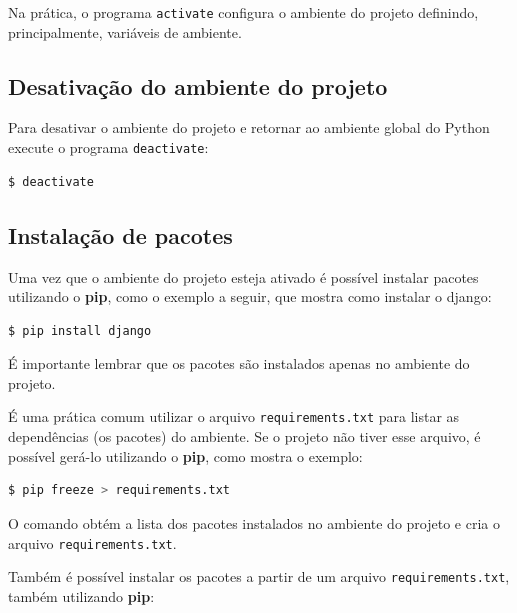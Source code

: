 \documentclass[brazil,a4paper,oneside,openright,parskip=full]{book}
\newcommand{\passthrough}[1]{#1}
\begin{document}
Na prática, o programa \passthrough{\lstinline!activate!} configura o
ambiente do projeto definindo, principalmente, variáveis de ambiente.

\hypertarget{desativauxe7uxe3o-do-ambiente-do-projeto}{%
\subsection{Desativação do ambiente do
projeto}\label{desativauxe7uxe3o-do-ambiente-do-projeto}}

Para desativar o ambiente do projeto e retornar ao ambiente global do
Python execute o programa \passthrough{\lstinline!deactivate!}:

\begin{lstlisting}[language=sh, style=nonumber]
$ deactivate
\end{lstlisting}

\hypertarget{instalauxe7uxe3o-de-pacotes}{%
\subsection{Instalação de pacotes}\label{instalauxe7uxe3o-de-pacotes}}

Uma vez que o ambiente do projeto esteja ativado é possível instalar
pacotes utilizando o \textbf{pip}, como o exemplo a seguir, que mostra
como instalar o django:

\begin{lstlisting}[language=sh, style=nonumber]
$ pip install django
\end{lstlisting}

É importante lembrar que os pacotes são instalados apenas no ambiente do
projeto.

É uma prática comum utilizar o arquivo
\passthrough{\lstinline!requirements.txt!} para listar as dependências
(os pacotes) do ambiente. Se o projeto não tiver esse arquivo, é
possível gerá-lo utilizando o \textbf{pip}, como mostra o exemplo:

\begin{lstlisting}[language=sh, style=nonumber]
$ pip freeze > requirements.txt
\end{lstlisting}

O comando obtém a lista dos pacotes instalados no ambiente do projeto e
cria o arquivo \passthrough{\lstinline!requirements.txt!}.

Também é possível instalar os pacotes a partir de um arquivo
\passthrough{\lstinline!requirements.txt!}, também utilizando
\textbf{pip}:
\end{document}
